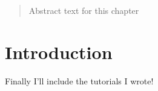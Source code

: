 \begin{abstract}
\noindent
Abstract text for this chapter
\end{abstract}

\section*{Introduction}
Finally I'll include the tutorials I wrote!
